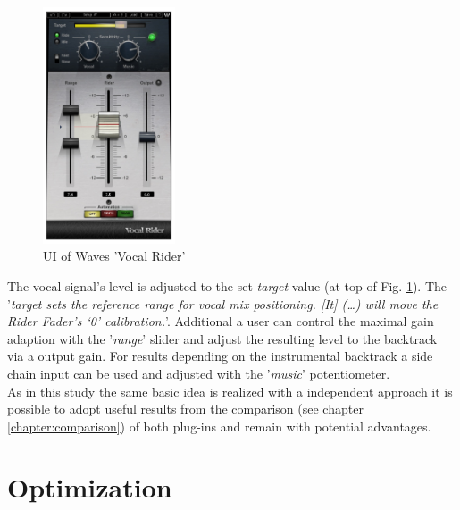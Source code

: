 \begin{figure}[H]
\includegraphics[width=0.35\textwidth]{images/vocalRiderUI}
	\centering
	\caption{UI of Waves 'Vocal Rider'\cite{vocalRiderM}}
	\label{VRUI}
\end{figure}

The vocal signal's level is adjusted to the set \textit{target} value (at top of Fig. \ref{VRUI}). The '\textit{target sets the reference range for vocal mix positioning. [It] (…) will move the Rider Fader’s ‘0’ calibration.}'\cite{vocalRiderM}. Additional a user can control the maximal gain adaption with the '\textit{range}' slider and adjust the resulting level to the backtrack via a output gain. For results depending on the instrumental backtrack a side chain input can be used and adjusted with the '\textit{music}' potentiometer.\\
As in this study the same basic idea is realized with a independent approach it is possible to adopt useful results from the comparison (see chapter \ref{chapter:comparison}) of both plug-ins and remain with potential advantages.\\

\section{Optimization}


